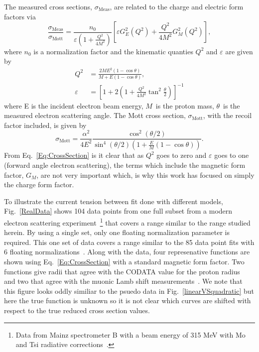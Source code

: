 \documentclass[10pt,aps,prc,twocolumn]{revtex4-1}
\begin{document}
The measured cross sections, $\sigma_{\mathrm{Meas}}$,  are related to the charge and electric form factors via 
\begin{equation}
\frac{\sigma_{\text{Meas}}}{\sigma_{\text{Mott}}} = \frac{n_0}{\varepsilon (1 + \frac{Q^2}{4M^2})} \left[\varepsilon G_E^2 (Q^2) + \frac{Q^2}{4M^2} G_M^2 (Q^2)\right],
\label{Eq:CrossSection}
\end{equation}
where $n_0$ is a normalization factor and the kinematic quanties $Q^2$ and $\varepsilon$ are given by
\begin{align}
Q^2 & = \frac{2M E^2 (1 - \cos{\theta})}{M + E (1 - \cos{\theta})}, \\
\varepsilon & = \left[1 + 2(1 + \frac{Q^2}{4M^2}  \tan^2{\frac{\theta}{2}})\right]^{-1}
\end{align}
where E is the incident electron beam energy, $M$~is the proton mass, $\theta$~is the measured electron scattering angle. 
The Mott cross section, $\sigma_{\text{Mott}}$, with the recoil factor included, is given by
\begin{equation}
\sigma_{\text{Mott}}  = \frac{\alpha^2}{4 E^2} \frac{\cos^2{(\theta / 2)}}{\sin^4{(\theta / 2)} ( 1 + \frac{E}{M} (1 - \cos{\theta}))}.
\end{equation}
From Eq.~\ref{Eq:CrossSection} is it clear that as $Q^2$ goes to zero and $\varepsilon$ goes to one (forward angle electron scattering), 
the terms which include the  magnetic form factor, $G_M$, are not very important which, is why this work has
focused on simply the charge form factor.

To illustrate the current tension between fit done with different models, Fig.~\ref{RealData} shows 
104 data points from one full subset from a modern electron scattering 
experiment~\footnote{Data from Mainz spectrometer B with a beam energy of 315 MeV with Mo and Tsi radiative 
corrections~\cite{Bernauer:2013tpr}.} 
that covers a range similar to the range studied herein.  By using a single set, only one floating normalization
parameter is required.
This one set of data covers a range similar to the 85 data point fits with 6 floating normalizations~\cite{Rosenfelder:1999cd,Hill:2010yb}.
Along with the data, four represenative functions are shown using Eq.~\ref{Eq:CrossSection} with a standard magnetic form factor.
Two functions give radii that agree with the CODATA value for the proton
radius~\cite{Bernauer:2013tpr,Ye:2017gyb} and two that agree with the muonic Lamb shift measurements~\cite{Higinbotham:2015rja,Griffioen:2015hta}.
We note that this figure looks oddly similiar to the psuedo data in Fig.~\ref{linearVSquadratic} but here the true function is unknown 
so it is not clear which curves are shifted with respect to the true reduced cross section values.
\end{document}
